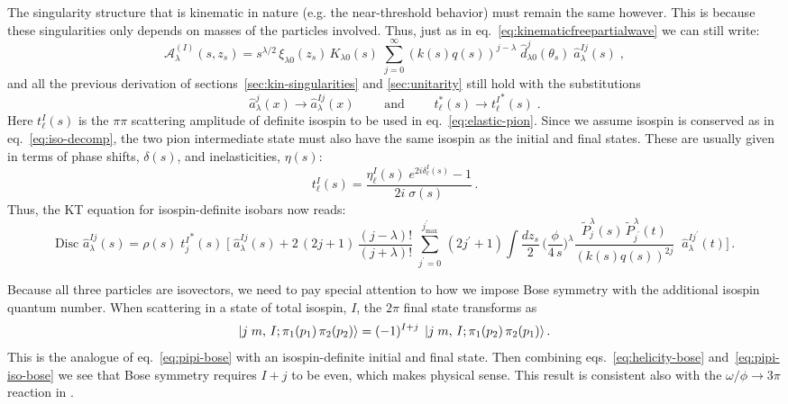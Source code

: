 \documentclass[10pt, aps,prd,amsmath,amssymb,superscriptaddress,onecolumn,
nofootinbib,showpacs,preprintnumbers]{revtex4-1}
\newcommand{\mand}{\qquad \text{ and } \qquad}
\newcommand{\jpmax}{{j^\prime_\text{max}}}
\newcommand{\Disc}{\text{Disc }}
\begin{document}
 The singularity structure that is kinematic in nature (e.g. the near-threshold behavior) must remain the same however. This is because these singularities only depends on masses of the particles involved. Thus, just as in eq.~\ref{eq:kinematicfreepartialwave} we can still write:
    \begin{equation}
      \label{eq:model-iso-helicity}
      \mathcal{A}^{(I)}_\lambda(s,z_s) = s^{\lambda/2} \, \xi_{\lambda0}(z_s) \, K_{\lambda0}(s) \; \sum_{j=0}^\infty (k(s)q(s))^{j-\lambda} \; \hat{d}^j_{\lambda0}(\theta_s) \; \hat{a}^{Ij}_{\lambda}(s)
      \; ,
    \end{equation}
and all the previous derivation of sections~\ref{sec:kin-singularities} and \ref{sec:unitarity} still hold with the substitutions
  \begin{equation}
    \hat{a}^j_\lambda(x) \rightarrow \hat{a}^{Ij}_{\lambda}(x)
    \mand
    t^*_\ell(s) \rightarrow {t^I_{\ell}}^*(s) \; .
  \end{equation}
Here \(t^I_{\ell}(s)\) is the \(\pi\pi\) scattering amplitude of definite isospin to be used in eq.~\ref{eq:elastic-pion}. Since we assume isospin is conserved as in eq.~\ref{eq:iso-decomp}, the two pion intermediate state must also have the same isospin as the initial and final states. These are usually given in terms of phase shifts, \(\delta(s)\), and inelasticities, \(\eta(s)\):
  \begin{equation}
    t^{I}_{\ell}(s) = \frac{\eta^I_\ell(s) \; e^{2i \delta^I_\ell(s)} -1}{2i \; \sigma(s)} \,.
  \end{equation}
Thus, the KT equation for isospin-definite isobars now reads:
  \begin{equation}
    \label{eq:final-kt-isospin}
    \Disc \hat{a}^{Ij}_{\lambda}(s) = \rho(s) \; {t^I_{j}}^*(s) \; \bigg[ \; \hat{a}^{Ij}_{\lambda}(s) + 2 \, (2j+1) \, \frac{(j-\lambda)!}{(j+\lambda)!} \;  \sum_{j^\prime = 0}^\jpmax \, (2j^\prime+1)
    \int \frac{dz_s}{2} \, \bigg(\frac{\phi}{4 \, s}\bigg)^\lambda \frac{\tilde{P}^\lambda_j(s) \, \tilde{P}_{j^\prime}^\lambda(t)}{(k(s)q(s))^{2j}} \;  \; \hat{a}^{Ij^\prime}_{\lambda}(t) \bigg]
    \,.
  \end{equation}

Because all three particles are isovectors, we need to pay special attention to how we impose Bose symmetry with the additional isospin quantum number. When scattering in a state of total isospin, \(I\), the \(2\pi\) final state transforms as
  \begin{equation}
    \label{eq:pipi-iso-bose}
    \ket{j \; m, \, I; \pi_1(p_1) \, \pi_2(p_2)} = (-1)^{I+j} \; \ket{j \; m, \, I; \pi_1(p_2) \, \pi_2(p_1)}.
  \end{equation}
This is the analogue of eq.~\ref{eq:pipi-bose} with an isospin-definite initial and final state.
Then combining eqs.~\ref{eq:helicity-bose} and~\ref{eq:pipi-iso-bose} we see that Bose symmetry requires \(I + j\) to be even, which makes physical sense. This result is consistent also with the \(\omega/\phi \to 3\pi\) reaction in \cite{Danilkin:2014cra,Niecknig:2012sj}.
\end{document}
